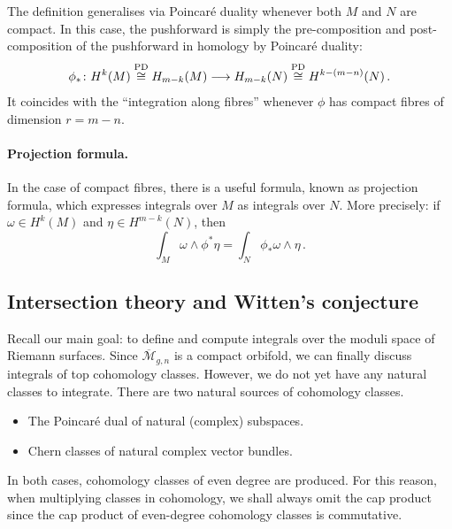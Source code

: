 \documentclass[11pt,reqno]{amsart}
\numberwithin{equation}{section}
\newcommand{\mc}[1]{\mathcal{#1}}
\newcommand{\M}{\mc{M}}
\newcommand{\Mbar}{\overline{\M}}
\theoremstyle{plain}
\theoremstyle{definition}
\begin{document}
The definition generalises via Poincaré duality whenever both $M$ and $N$ are compact. In this case, the pushforward is simply the pre-composition and post-composition of the pushforward in homology by Poincaré duality:
\begin{equation}
  \phi_* \colon
  H^k(M)
  \overset{\textup{PD}}{\cong}
  H_{m-k}(M)
  \longrightarrow
  H_{m-k}(N)
  \overset{\textup{PD}}{\cong}
  H^{k-(m-n)}(N) \,.
\end{equation}
It coincides with the ``integration along fibres'' whenever $\phi$ has compact fibres of dimension $r = m-n$. 

\paragraph{Projection formula.}
In the case of compact fibres, there is a useful formula, known as projection formula, which expresses integrals over $M$ as integrals over $N$. More precisely: if $\omega \in H^k(M)$ and $\eta \in H^{m-k}(N)$, then
\begin{equation}
  \int_M \omega \wedge \phi^*\eta
  =
  \int_N \phi_* \omega \wedge \eta \,.
\end{equation}

\subsection{Intersection theory and Witten's conjecture}
Recall our main goal: to define and compute integrals over the moduli space of Riemann surfaces. Since $\Mbar_{g,n}$ is a compact orbifold, we can finally discuss integrals of top cohomology classes. However, we do not yet have any natural classes to integrate. There are two natural sources of cohomology classes.
\begin{itemize}
  \item The Poincaré dual of natural (complex) subspaces.

  \item Chern classes of natural complex vector bundles.
\end{itemize}
In both cases, cohomology classes of even degree are produced. For this reason, when multiplying classes in cohomology, we shall always omit the cap product since the cap product of even-degree cohomology classes is commutative.
\end{document}
